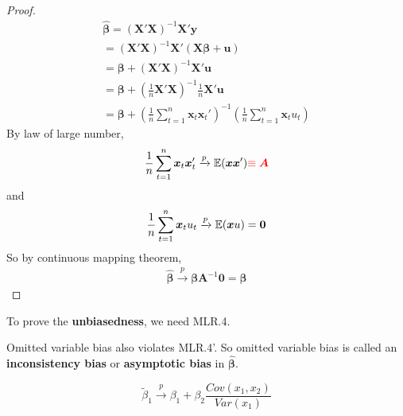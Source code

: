 \documentclass[]{article}
\begin{document}
		\begin{proof}
			\begin{gather*}
				\hat{\bm{\beta}} = (\bm{X}' \bm{X})^{-1} \bm{X}' \bm{y} \\
				= (\bm{X}' \bm{X})^{-1} \bm{X}' (\bm{X}\bm{\beta} + \bm{u}) \\
				= \bm{\beta} + (\bm{X}' \bm{X})^{-1} \bm{X}' \bm{u} \\
				= \bm{\beta} + (\frac{1}{n} \bm{X}' \bm{X})^{-1} \frac{1}{n} \bm{X}' \bm{u} \\
				= \bm{\beta} + (\frac{1}{n} \sum_{t=1}^n \bm{x}_t \bm{x}_t')^{-1} (\frac{1}{n} \sum_{t=1}^n \bm{x}_t u_t) 
			\end{gather*}
			By law of large number, 
			\begin{gather*}
				\frac{1}{n} \sum_{t=1}^n \bm{x}_t \bm{x}_t' \xrightarrow{p} \mathbb{E}({\bm{x} \bm{x}'}) \textcolor{red}{\equiv \bm{A}}
			\end{gather*}
			and 
			\begin{gather*}
				\frac{1}{n} \sum_{t=1}^n \bm{x}_t u_t \xrightarrow{p} \mathbb{E}({\bm{x} u}) = \bm{0}
			\end{gather*}
			So by continuous mapping theorem,
			\begin{gather*}
				\hat{\bm{\beta}} \xrightarrow{p} \bm{\beta} \bm{A}^{-1} \bm{0} = \bm{\beta}
			\end{gather*}
		\end{proof}
		
		\begin{remark}
			To prove the \textbf{unbiasedness}, we need MLR.4.
		\end{remark}
		
		\begin{remark}
			Omitted variable bias also violates MLR.4'. So omitted variable bias is called an \textbf{inconsistency bias} or \textbf{asymptotic bias} in $\hat{\bm{\beta}}$.
		\end{remark}
		\begin{example}
			\[
				\tilde{\beta}_1 \xrightarrow{p} \beta_1 + \beta_2 \frac{Cov(x_1, x_2)}{Var(x_1)}
			\]
		\end{example}
		
\end{document}
